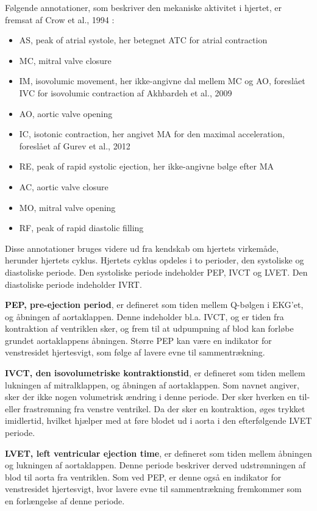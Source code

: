 Følgende annotationer, som beskriver den mekaniske aktivitet i hjertet, er fremsat af Crow et al., 1994 \cite{crow1994relationship}\cite{paukkunen2014seismocardiography}:
\begin{itemize}
    \item AS, peak of atrial systole, her betegnet ATC for atrial contraction
    \item MC, mitral valve closure
    \item IM, isovolumic movement, her ikke-angivne dal mellem MC og AO, foreslået IVC for isovolumic contraction af Akhbardeh et al., 2009 \cite{akhbardeh2009comparative}
    \item AO, aortic valve opening
    \item IC, isotonic contraction, her angivet MA for den maximal acceleration, foreslået af Gurev et al., 2012 \cite{gurev2012mechanisms}
    \item RE, peak of rapid systolic ejection, her ikke-angivne bølge efter MA
    \item AC, aortic valve closure
    \item MO, mitral valve opening
    \item RF, peak of rapid diastolic filling
\end{itemize}

Disse annotationer bruges videre ud fra kendskab om hjertets virkemåde, herunder hjertets cyklus.
Hjertets cyklus opdeles i to perioder, den systoliske og diastoliske periode. Den systoliske periode indeholder PEP, IVCT og LVET. Den diastoliske periode indeholder IVRT. \cite{di2013wearable}

\textbf{PEP, pre-ejection period}, er defineret som tiden mellem Q-bølgen i EKG’et, og åbningen af aortaklappen. Denne indeholder bl.a. IVCT, og er tiden fra kontraktion af ventriklen sker, og frem til at udpumpning af blod kan forløbe grundet aortaklappens åbningen. Større PEP kan være en indikator for venstresidet hjertesvigt, som følge af lavere evne til sammentrækning. \cite{di2013wearable}

\textbf{IVCT, den isovolumetriske kontraktionstid}, er defineret som tiden mellem lukningen af mitralklappen, og åbningen af aortaklappen. Som navnet angiver, sker der ikke nogen volumetrisk ændring i denne periode. Der sker hverken en til- eller frastrømning fra venstre ventrikel. Da der sker en kontraktion, øges trykket imidlertid, hvilket hjælper med at føre blodet ud i aorta i den efterfølgende LVET periode. \cite{di2013wearable}

\textbf{LVET, left ventricular ejection time}, er defineret som tiden mellem åbningen og lukningen af aortaklappen. Denne periode beskriver derved udstrømningen af blod til aorta fra ventriklen. Som ved PEP, er denne også en indikator for venstresidet hjertesvigt, hvor lavere evne til sammentrækning fremkommer som en forlængelse af denne periode. \cite{di2013wearable}

